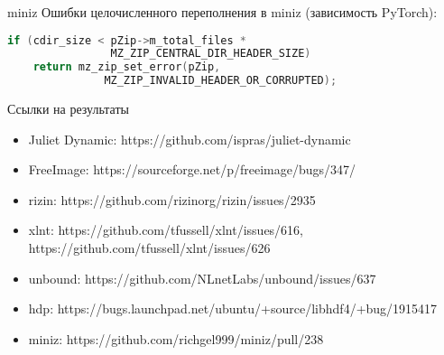 \documentclass[10pt]{beamer}
\begin{document}
\begin{frame}[fragile]{miniz}
Ошибки целочисленного переполнения в miniz (зависимость PyTorch):
\begin{lstlisting}[language=C, basicstyle=\small\ttfamily,
                   xleftmargin=1em,
                   captionpos=b,
                   label=lst:miniz-overflow]
if (cdir_size < pZip->m_total_files *
                MZ_ZIP_CENTRAL_DIR_HEADER_SIZE)
    return mz_zip_set_error(pZip,
               MZ_ZIP_INVALID_HEADER_OR_CORRUPTED);
\end{lstlisting}
\end{frame}

\begin{frame}{Ссылки на результаты}
\begin{itemize}
    \item Juliet Dynamic: https://github.com/ispras/juliet-dynamic
    \item FreeImage: https://sourceforge.net/p/freeimage/bugs/347/
    \item rizin: https://github.com/rizinorg/rizin/issues/2935
    \item xlnt: https://github.com/tfussell/xlnt/issues/616,
        https://github.com/tfussell/xlnt/issues/626
    \item unbound: https://github.com/NLnetLabs/unbound/issues/637
    \item hdp: https://bugs.launchpad.net/ubuntu/+source/libhdf4/+bug/1915417
    \item miniz: https://github.com/richgel999/miniz/pull/238
\end{itemize}
\end{frame}
\end{document}
